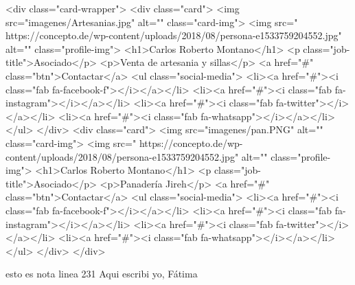 <div class="card-wrapper">
  <div class="card">
    <img src="imagenes/Artesanias.jpg" alt="" class="card-img">
    <img src=" https://concepto.de/wp-content/uploads/2018/08/persona-e1533759204552.jpg" alt="" class="profile-img">
    <h1>Carlos Roberto Montano</h1>
    <p class="job-title">Asociado</p>
    <p>Venta de artesania y sillas</p>
    <a href="#" class="btn">Contactar</a>
    <ul class="social-media">
      <li><a href="#"><i class="fab fa-facebook-f"></i></a></li> 
      <li><a href="#"><i class="fab fa-instagram"></i></a></li>   
      <li><a href="#"><i class="fab fa-twitter"></i></a></li>   
      <li><a href="#"><i class="fab fa-whatsapp"></i></a></li>     
    </ul>
  </div>
<div class="card">
    <img src="imagenes/pan.PNG" alt="" class="card-img">
    <img src=" https://concepto.de/wp-content/uploads/2018/08/persona-e1533759204552.jpg" alt="" class="profile-img">
    <h1>Carlos Roberto Montano</h1>
    <p class="job-title">Asociado</p>
    <p>Panadería Jireh</p>
    <a href="#" class="btn">Contactar</a>
    <ul class="social-media">
      <li><a href="#"><i class="fab fa-facebook-f"></i></a></li> 
      <li><a href="#"><i class="fab fa-instagram"></i></a></li>   
      <li><a href="#"><i class="fab fa-twitter"></i></a></li>   
      <li><a href="#"><i class="fab fa-whatsapp"></i></a></li>     
    </ul>
  </div>
</div>

esto es nota linea 231
Aqui escribi yo, Fátima

